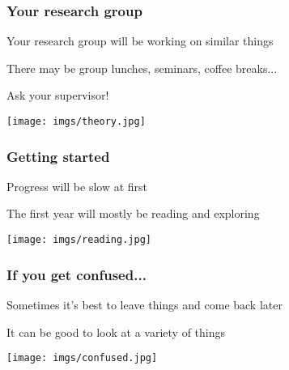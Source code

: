 \documentclass[aspectratio=169]{beamer}
\begin{document}
\begin{frame}
    \frametitle{Your research group}
    \centering
    \begin{minipage}{0.4\textwidth}
        \centering
        \Large

        Your \alert{research group} will be working
        on similar things

        \vspace{1em}

        There may be group lunches, seminars, coffee breaks...

        \vspace{1em}

        Ask your supervisor!

    \end{minipage}
    \qquad
    \begin{minipage}{0.4\textwidth}
        \texttt{[image: imgs/theory.jpg]}
    \end{minipage}
\end{frame}
\begin{frame}
    \frametitle{Getting started}
    \centering
    \begin{minipage}{0.40\textwidth}
        \centering
        \Large

        Progress will be \alert{slow} at first

        \vspace{1em}

        The first year will mostly be \alert{reading} and
        \alert{exploring}

        \vspace{1em}
    \end{minipage}
    \qquad
    \begin{minipage}{0.4\textwidth}
        \texttt{[image: imgs/reading.jpg]}
    \end{minipage}
\end{frame}
\begin{frame}
    \frametitle{If you get confused...}
    \centering
    \begin{minipage}{0.4\textwidth}
        \centering
        \Large

        Sometimes it's best to leave things and
        \alert{come back later}

        \vspace{1em}

        It can be good to look at a \alert{variety}
        of things
    \end{minipage}
    \qquad
    \begin{minipage}{0.4\textwidth}
        \texttt{[image: imgs/confused.jpg]}
    \end{minipage}
\end{frame}
\end{document}
